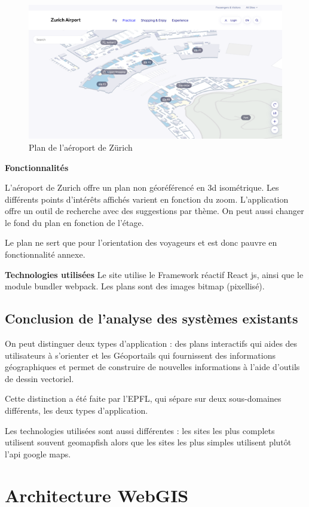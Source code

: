 \documentclass[
    iai, %
    il, %
]{heig-tb}
\begin{document}
\begin{figure}[H]
    \caption{Plan de l'aéroport de Zürich}
    \centering
    \includegraphics{planZurichAirport.png}
\end{figure}

\textbf{Fonctionnalités}

L'aéroport de Zurich \cite{zurich-aeroport} offre un plan non géoréférencé en 3d isométrique.
Les différents points d'intérêts affichés varient en fonction du zoom.
L'application offre un outil de recherche avec des suggestions par thème.
On peut aussi changer le fond du plan en fonction de l'étage.

Le plan ne sert que pour l'orientation des voyageurs et est donc pauvre en fonctionnalité annexe.

\textbf{Technologies utilisées}
Le site utilise le Framework réactif React js, ainsi que le module bundler webpack.  Les plans sont des images bitmap (pixellisé).

\subsection{Conclusion de l'analyse des systèmes existants}
On peut distinguer deux types d'application :
des plans interactifs qui aides des utilisateurs à s'orienter et les Géoportails qui fournissent des informations géographiques et permet de construire de nouvelles informations à l'aide d'outils de dessin vectoriel.

Cette distinction a été faite par l'EPFL, qui sépare sur deux sous-domaines différents, les deux types d'application.

Les technologies utilisées sont aussi différentes : les sites les plus complets utilisent souvent geomapfish alors que les sites les plus simples utilisent plutôt l'api google maps.

\section{Architecture WebGIS}
\end{document}
